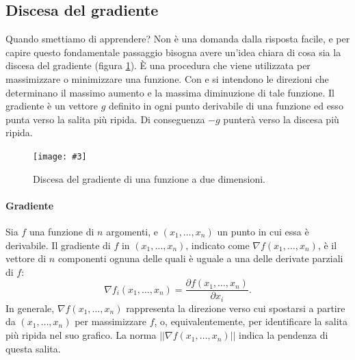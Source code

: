 \documentclass[12pt, twoside, letterpaper]{report}
\newcommand{\img}[4] {
	\begin{figure}
		\centering
		\texttt{[image: \#3]}\\
		\caption{#1}
		\label{fig:#4}
	\end{figure}
}
\begin{document}
			\subsection{Discesa del gradiente}
				Quando smettiamo di apprendere? Non è una domanda dalla risposta facile, e per capire questo fondamentale passaggio bisogna avere un'idea chiara di cosa sia la discesa del gradiente (figura \ref{fig:gradient_descent}). È una procedura che viene utilizzata per massimizzare o minimizzare una funzione. Con  e  si intendono le direzioni che determinano il massimo aumento e la massima diminuzione di tale funzione. Il gradiente è un vettore $g$ definito in ogni punto derivabile di una funzione ed esso punta verso la salita più ripida. Di conseguenza $-g$ punterà verso la discesa più ripida.
				
				\img{Discesa del gradiente di una funzione a due dimensioni. \cite{kriesel}}{0.5}{gradient_descent_2d.png}{gradient_descent}
				
				\paragraph{Gradiente} Sia $f$ una funzione di $n$ argomenti, e $(x_1, \dots, x_n)$ un punto in cui essa è derivabile. Il gradiente di $f$ in $(x_1, \dots, x_n)$, indicato come $\nabla f(x_1, \dots, x_n)$, è il vettore di $n$ componenti ognuna delle quali è uguale a una delle derivate parziali di $f$: 
					$$\nabla f_i(x_1, \dots, x_n) = \frac{\partial f(x_1, \dots, x_n)}{\partial x_i}.$$
					In generale, $\nabla f(x_1, \dots, x_n)$ rappresenta la direzione verso cui spostarsi a partire da $(x_1, \dots, x_n)$ per massimizzare $f$, o, equivalentemente, per identificare la salita più ripida nel suo grafico. La norma $||\nabla f(x_1, \dots, x_n)||$ indica la pendenza di questa salita.
					
\end{document}
